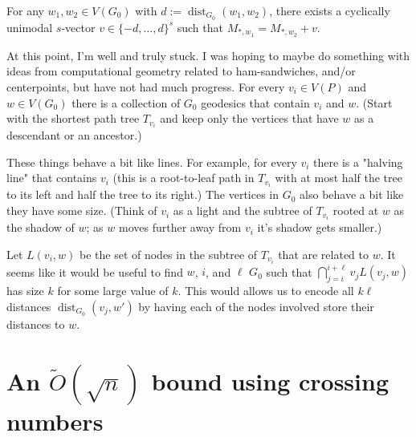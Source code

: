 \documentclass{patmorin}
\DeclareMathOperator{\dist}{dist}
\begin{document}
%

\begin{lem}
    For any $w_1,w_2\in V(G_0)$ with $d:=\dist_{G_0}(w_1,w_2)$, there exists a cyclically unimodal $s$-vector $v\in\{-d,\ldots,d\}^s$ such that $M_{*,w_1}=M_{*,w_2}+v$.
\end{lem}

At this point, I'm well and truly stuck.  I was hoping to maybe do something with ideas from computational geometry related to ham-sandwiches, and/or centerpoints, but have not had much progress. For every $v_i\in V(P)$ and $w\in V(G_0)$ there is a collection of $G_0$ geodesics that contain $v_i$ and $w$.  (Start with the shortest path tree  $T_{v_i}$ and keep only the vertices that have $w$ as a descendant or an ancestor.)

These things behave a bit like lines. For example, for every $v_i$ there is a "halving line" that contains $v_i$ (this is a root-to-leaf path in $T_{v_i}$ with at most half the tree to its left and half the tree to its right.)  The vertices in $G_0$ also behave a bit like they have some size.  (Think of $v_i$ as a light and the subtree of $T_{v_i}$ rooted at $w$ as the shadow of $w$; as $w$ moves further away from $v_i$ it's shadow gets smaller.)

Let $L(v_i,w)$ be the set of nodes in the subtree of $T_{v_i}$ that are related to $w$.  It seems like it would be useful to find $w$, $i$, and $\ell$ $G_0$ such that $\bigcap_{j=i}^{i+\ell} v_j L(v_j,w)$ has size $k$ for some large value of $k$.  This would allows us to encode all $k\ell$ distances $\dist_{G_0}(v_j,w')$ by having each of the nodes involved store their distances to $w$.

\section{An $\tilde{O}(\sqrt{n})$ bound using crossing numbers}
\end{document}
